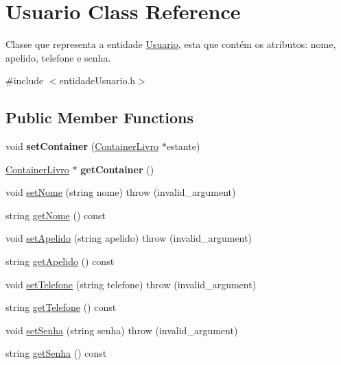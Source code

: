 \hypertarget{classUsuario}{}\section{Usuario Class Reference}
\label{classUsuario}


Classe que representa a entidade \hyperlink{classUsuario}{Usuario}, esta que contém os atributos\+: nome, apelido, telefone e senha.  




{\ttfamily \#include $<$entidade\+Usuario.\+h$>$}

\subsection*{Public Member Functions}
\begin{DoxyCompactItemize}
\item 
\mbox{\label{classUsuario_a035958a1d42336c1e66b62996496fce9}} 
void {\bfseries set\+Container} (\hyperlink{classContainerLivro}{Container\+Livro} $\ast$estante)
\item 
\mbox{\label{classUsuario_a189af8c0cb46d5f5788db9d0381959a8}} 
\hyperlink{classContainerLivro}{Container\+Livro} $\ast$ {\bfseries get\+Container} ()
\item 
void \hyperlink{classUsuario_a7c9b128fcb7b02e6595200ad1cf6f89b}{set\+Nome} (string nome)  throw (invalid\+\_\+argument)
\item 
string \hyperlink{classUsuario_a6aeb8cccd96e84aedeb50a68b4f9a3d4}{get\+Nome} () const
\item 
void \hyperlink{classUsuario_ae1c5a1f4d241bfd859ba8d12271265c7}{set\+Apelido} (string apelido)  throw (invalid\+\_\+argument)
\item 
string \hyperlink{classUsuario_a78d374a50eed8b7ceeec4b874ba154d4}{get\+Apelido} () const
\item 
void \hyperlink{classUsuario_a8414f48478d2edf70a4ab274136a3bdf}{set\+Telefone} (string telefone)  throw (invalid\+\_\+argument)
\item 
string \hyperlink{classUsuario_ae2a44b0716930c62458e6fc8c7339537}{get\+Telefone} () const
\item 
void \hyperlink{classUsuario_ad6ca0fc126212f12a73e7e8536646d60}{set\+Senha} (string senha)  throw (invalid\+\_\+argument)
\item 
string \hyperlink{classUsuario_a5a6149716b03d4b1408aaa6a0dc4bb32}{get\+Senha} () const
\end{DoxyCompactItemize}


